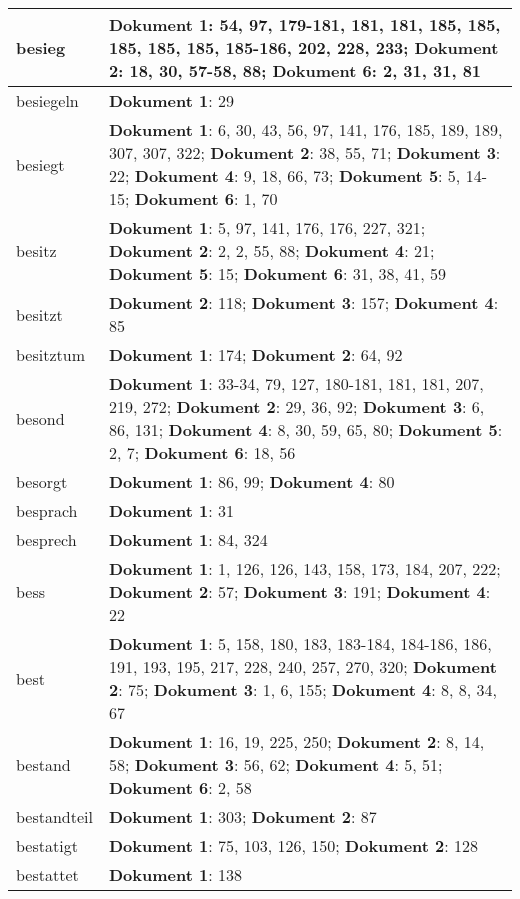 \documentclass[a5paper]{article}
\begin{document}
\begin{longtable}[l]{|l|p{3in}|}
\hline
besieg & \textbf{Dokument 1}: 54, 97, 179-181, 181, 181, 185, 185, 185, 185, 185, 185-186, 202, 228, 233; \textbf{Dokument 2}: 18, 30, 57-58, 88; \textbf{Dokument 6}: 2, 31, 31, 81 \\
\hline
besiegeln & \textbf{Dokument 1}: 29 \\
\hline
besiegt & \textbf{Dokument 1}: 6, 30, 43, 56, 97, 141, 176, 185, 189, 189, 307, 307, 322; \textbf{Dokument 2}: 38, 55, 71; \textbf{Dokument 3}: 22; \textbf{Dokument 4}: 9, 18, 66, 73; \textbf{Dokument 5}: 5, 14-15; \textbf{Dokument 6}: 1, 70 \\
\hline
besitz & \textbf{Dokument 1}: 5, 97, 141, 176, 176, 227, 321; \textbf{Dokument 2}: 2, 2, 55, 88; \textbf{Dokument 4}: 21; \textbf{Dokument 5}: 15; \textbf{Dokument 6}: 31, 38, 41, 59 \\
\hline
besitzt & \textbf{Dokument 2}: 118; \textbf{Dokument 3}: 157; \textbf{Dokument 4}: 85 \\
\hline
besitztum & \textbf{Dokument 1}: 174; \textbf{Dokument 2}: 64, 92 \\
\hline
besond & \textbf{Dokument 1}: 33-34, 79, 127, 180-181, 181, 181, 207, 219, 272; \textbf{Dokument 2}: 29, 36, 92; \textbf{Dokument 3}: 6, 86, 131; \textbf{Dokument 4}: 8, 30, 59, 65, 80; \textbf{Dokument 5}: 2, 7; \textbf{Dokument 6}: 18, 56 \\
\hline
besorgt & \textbf{Dokument 1}: 86, 99; \textbf{Dokument 4}: 80 \\
\hline
besprach & \textbf{Dokument 1}: 31 \\
\hline
besprech & \textbf{Dokument 1}: 84, 324 \\
\hline
bess & \textbf{Dokument 1}: 1, 126, 126, 143, 158, 173, 184, 207, 222; \textbf{Dokument 2}: 57; \textbf{Dokument 3}: 191; \textbf{Dokument 4}: 22 \\
\hline
best & \textbf{Dokument 1}: 5, 158, 180, 183, 183-184, 184-186, 186, 191, 193, 195, 217, 228, 240, 257, 270, 320; \textbf{Dokument 2}: 75; \textbf{Dokument 3}: 1, 6, 155; \textbf{Dokument 4}: 8, 8, 34, 67 \\
\hline
bestand & \textbf{Dokument 1}: 16, 19, 225, 250; \textbf{Dokument 2}: 8, 14, 58; \textbf{Dokument 3}: 56, 62; \textbf{Dokument 4}: 5, 51; \textbf{Dokument 6}: 2, 58 \\
\hline
bestandteil & \textbf{Dokument 1}: 303; \textbf{Dokument 2}: 87 \\
\hline
bestatigt & \textbf{Dokument 1}: 75, 103, 126, 150; \textbf{Dokument 2}: 128 \\
\hline
bestattet & \textbf{Dokument 1}: 138 \\

\end{longtable}
\end{document}
